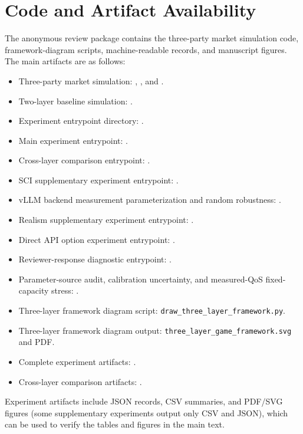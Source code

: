 \documentclass[11pt,a4paper]{article}
\begin{document}
\section{Code and Artifact Availability}
\label{sec:code_availability}

The anonymous review package contains the three-party market simulation code, framework-diagram scripts, machine-readable records, and manuscript figures. The main artifacts are as follows:
\begingroup
\raggedright
\begin{itemize}[leftmargin=2em]
  \item Three-party market simulation: , , and .
  \item Two-layer baseline simulation: .
  \item Experiment entrypoint directory: .
  \item Main experiment entrypoint: .
  \item Cross-layer comparison entrypoint: .
  \item SCI supplementary experiment entrypoint: .
  \item vLLM backend measurement parameterization and random robustness: .
  \item Realism supplementary experiment entrypoint: .
  \item Direct API option experiment entrypoint: .
  \item Reviewer-response diagnostic entrypoint: .
  \item Parameter-source audit, calibration uncertainty, and measured-QoS fixed-capacity stress: .
  \item Three-layer framework diagram script: \texttt{draw\_three\_layer\_framework.py}.
  \item Three-layer framework diagram output: \texttt{three\_layer\_game\_framework.svg} and PDF.
  \item Complete experiment artifacts: .
  \item Cross-layer comparison artifacts: .
\end{itemize}
\endgroup
Experiment artifacts include JSON records, CSV summaries, and PDF/SVG figures (some supplementary experiments output only CSV and JSON), which can be used to verify the tables and figures in the main text.

\small


\end{document}
